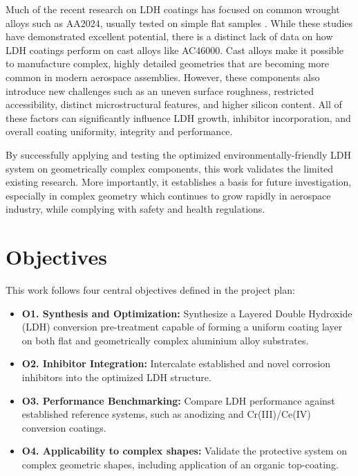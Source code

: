 \documentclass[11pt,twoside,a4paper,final]{report}
\begin{document}
Much of the recent research on LDH coatings has focused on common wrought alloys such as AA2024, usually tested on simple flat samples \cite{Tedim2014,Tedim2011,He2020,Bouali2020}. While these studies have demonstrated excellent potential, there is a distinct lack of data on how LDH coatings perform on cast alloys like AC46000. Cast alloys make it possible to manufacture complex, highly detailed geometries that are becoming more common in modern aerospace assemblies. However, these components also introduce new challenges such as an uneven surface roughness, restricted accessibility, distinct microstructural features, and higher silicon content. All of these factors can significantly influence LDH growth, inhibitor incorporation, and overall coating uniformity, integrity and performance.

By successfully applying and testing the optimized environmentally-friendly LDH system on geometrically complex components, this work validates the limited existing research. More importantly, it establishes a basis for future investigation, especially in complex geometry which continues to grow rapidly in aerospace industry, while complying with safety and health regulations.

\section{Objectives}
This work follows four central objectives defined in the project plan:
\begin{itemize}
    \item \textbf{O1. Synthesis and Optimization:} Synthesize a Layered Double Hydroxide (LDH) conversion pre-treatment capable of forming a uniform coating layer on both flat and geometrically complex aluminium alloy substrates.
    
    \item \textbf{O2. Inhibitor Integration:} Intercalate established and novel corrosion inhibitors into the optimized LDH structure.
    
    \item \textbf{O3. Performance Benchmarking:} Compare LDH performance against established reference systems, such as anodizing and Cr(III)/Ce(IV) conversion coatings.
    
    \item \textbf{O4. Applicability to complex shapes:} Validate the protective system on complex geometric shapes, including application of an organic top-coating.
\end{itemize}
\end{document}
